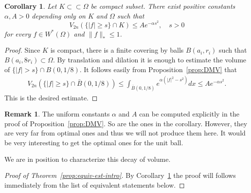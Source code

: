 \documentclass{amsart}
\newcommand{\al}{\alpha}
\newcommand{\Om}{\Omega}
\newtheorem{cor}[thm]{Corollary}
\theoremstyle{definition}
\newtheorem{remark}[thm]{Remark}
\numberwithin{thm}{section}
\numberwithin{equation}{section}
\renewcommand{\[}{\begin{equation}}
\renewcommand{\]}{\end{equation}}
\begin{document}
\begin{cor}\label{cor:exp-int}  
Let $K \subset \subset \Om$ be compact subset.   There exist positive constants $\al, A>0$ depending only on $K$ and $\Om$ such that 
$$
	V_{2n} (\{|f| \geq s\} \cap K) \leq A e^{-\al s^2}, \quad s>0
$$
for every $f\in W^*(\Om)$ and $\|f\|_* \leq 1$.
\end{cor}

\begin{proof} Since $K$ is compact, there is a finite covering by  balls $B(a_i,r_i)$ such that $B(a_i, 8 r_i) \subset \Om$. By translation and dilation it is enough to estimate the volume of $\{|f|>s\} \cap B(0, 1/8)$. It follows easily from Proposition~\ref{prop:DMV} that
$$\begin{aligned}
	V_{2n} \left(\{|f|\geq s\} \cap \bar B(0, 1/8)\right) 
\leq \int_{\bar B(0,1/8)} e^{\al (|f|^2 - s^2)} dx \leq A e^{-\al s^2}. 
\end{aligned}$$
This is the desired estimate.
\end{proof}

\begin{remark} The uniform constants $\al$ and $A$ can be computed explicitly in the proof of Proposition~\ref{prop:DMV}. So are the ones in the corollary. However, they are very far from optimal ones and thus we will not produce them here. It would be very interesting to get the optimal ones for the unit ball.
\end{remark}

We are in position to characterize this decay of volume.

\begin{proof}[Proof of Theorem~\ref{prop:equiv-est-intro}] By  Corollary~\ref{cor:exp-int} the proof will follows immediately from the list of equivalent statements below. 
\end{proof}
\end{document}
